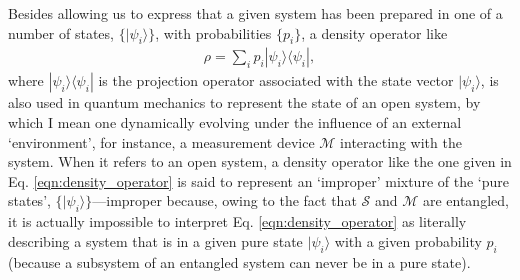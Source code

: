 \documentclass[12pt,english,twoside]{article}
\numberwithin{equation}{section}
\begin{document}
Besides allowing us to express that a given system has been prepared in one of a number of states, $\{| \psi_i \rangle\}$, with probabilities $\{p_i\}$, a density operator like
\begin{align}
  \label{eqn:density_operator}
  \rho = \sum_i p_i| \psi_i \rangle\langle \psi_i |,
\end{align}
where $| \psi_i \rangle\langle \psi_i |$ is the projection operator associated with the state vector $| \psi_i \rangle$, is also used in quantum mechanics to represent the state of an open system, by which I mean one dynamically evolving under the influence of an external `environment', for instance, a measurement device $\mathcal{M}$ interacting with the system. When it refers to an open system, a density operator like the one given in Eq. \eqref{eqn:density_operator} is said to represent an `improper' mixture \citep[]{despagnat1966, despagnat1971} of the `pure states', $\{| \psi_i \rangle\}$---improper because, owing to the fact that $\mathcal{S}$ and $\mathcal{M}$ are entangled, it is actually impossible to interpret Eq. \eqref{eqn:density_operator} as literally describing a system that is in a given pure state $| \psi_i \rangle$ with a given probability $p_i$ (because a subsystem of an entangled system can never be in a pure state).
\end{document}

